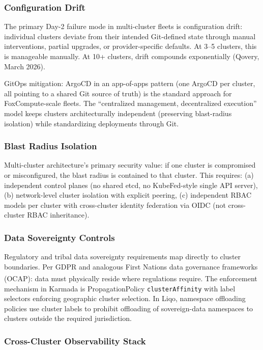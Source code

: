\documentclass[11pt,letterpaper]{article}
\begin{document}
\subsubsection{Configuration Drift}

The primary Day-2 failure mode in multi-cluster fleets is configuration drift: individual clusters deviate from their intended Git-defined state through manual interventions, partial upgrades, or provider-specific defaults. At 3--5 clusters, this is manageable manually. At 10+ clusters, drift compounds exponentially (Qovery, March 2026).

GitOps mitigation: ArgoCD in an app-of-apps pattern (one ArgoCD per cluster, all pointing to a shared Git source of truth) is the standard approach for FoxCompute-scale fleets. The ``centralized management, decentralized execution'' model keeps clusters architecturally independent (preserving blast-radius isolation) while standardizing deployments through Git.

\subsubsection{Blast Radius Isolation}

Multi-cluster architecture's primary security value: if one cluster is compromised or misconfigured, the blast radius is contained to that cluster. This requires: (a) independent control planes (no shared etcd, no KubeFed-style single API server), (b) network-level cluster isolation with explicit peering, (c) independent RBAC models per cluster with cross-cluster identity federation via OIDC (not cross-cluster RBAC inheritance).

\subsubsection{Data Sovereignty Controls}

Regulatory and tribal data sovereignty requirements map directly to cluster boundaries. Per GDPR and analogous First Nations data governance frameworks (OCAP\textsuperscript{\textregistered}): data must physically reside where regulations require. The enforcement mechanism in Karmada is PropagationPolicy \texttt{clusterAffinity} with label selectors enforcing geographic cluster selection. In Liqo, namespace offloading policies use cluster labels to prohibit offloading of sovereign-data namespaces to clusters outside the required jurisdiction.

\subsubsection{Cross-Cluster Observability Stack}
\end{document}
